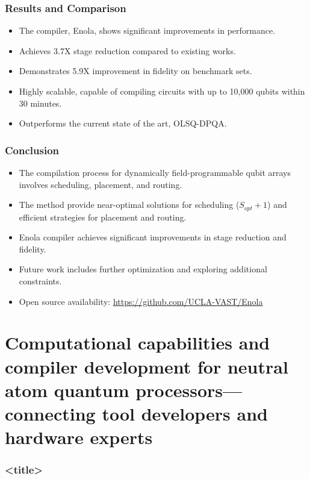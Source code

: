 \documentclass[18 pt]{beamer}
\begin{document}
\begin{frame}
    \frametitle{Results and Comparison}
    \begin{itemize}
        \item The compiler, Enola, shows significant improvements in performance.
        \item Achieves 3.7X stage reduction compared to existing works.
        \item Demonstrates 5.9X improvement in fidelity on benchmark sets.
        \item Highly scalable, capable of compiling circuits with up to 10,000 qubits within 30 minutes.
        \item Outperforms the current state of the art, OLSQ-DPQA.
    \end{itemize}
\end{frame}

\begin{frame}
    \frametitle{Conclusion}
    \begin{itemize}
        \item The compilation process for dynamically field-programmable qubit arrays involves scheduling, placement, and routing.
        \item The method provide near-optimal solutions for scheduling ($S_{opt} +1$) and efficient strategies for placement and routing.
        \item Enola compiler achieves significant improvements in stage reduction and fidelity.
        \item Future work includes further optimization and exploring additional constraints.
        \item Open source availability: \url{https://github.com/UCLA-VAST/Enola}
    \end{itemize}
\end{frame}

\section{Computational capabilities and compiler development for neutral atom quantum processors—connecting tool developers and hardware experts}
\begin{frame}
    \frametitle{<title>}

    

\end{frame}
\end{document}
